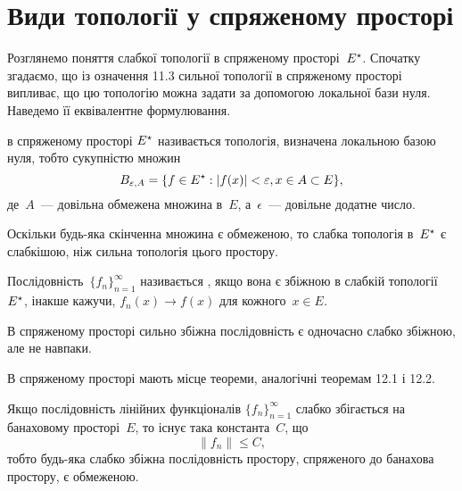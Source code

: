 \section{Види топології у спряженому просторі}

Розглянемо поняття слабкої топології в спряженому
просторі~$E^\star$. Спочатку згадаємо, що із \error означення 11.3 сильної
топології в спряженому просторі випливає, що цю топологію
можна задати за допомогою локальної бази нуля. Наведемо її
еквівалентне формулювання.

\begin{definition}
 в спряженому просторі
$E^\star$ називається топологія, визначена локальною базою нуля,
тобто сукупністю множин
\begin{equation*}
    B_{\varepsilon, A} = \{ f \in E^\star: |f(x)| < \varepsilon, x \in A \subset E\},
\end{equation*}
де~$A$~--- довільна обмежена множина в~$E$, а~$\epsilon$~--- довільне
додатне число.
\end{definition}

\begin{remark}
Оскільки будь-яка скінченна множина є
обмеженою, то слабка топологія в~$E^\star$ є слабкішою, ніж
сильна топологія цього простору.
\end{remark}

\begin{definition}
Послідовність~$\{f_n\}_{n = 1}^\infty$
називається ,
якщо вона є збіжною в слабкій топології~$E^\star$,
інакше кажучи, $f_n(x) \to f(x)$ для кожного~$x \in E$.
\end{definition}

\begin{remark}
В спряженому просторі сильно збіжна
послідовність є одночасно слабко збіжною, але не навпаки.
\end{remark}

В спряженому просторі мають місце теореми, аналогічні \error теоремам 12.1 і 12.2.

\begin{theorem}
Якщо послідовність лінійних функціоналів
$\{f_n\}_{n = 1}^\infty$
слабко збігається на банаховому просторі~$E$, то
існує така константа~$C$, що
\begin{equation*}
    \|f_n\| \le C,
\end{equation*}
тобто будь-яка слабко збіжна послідовність простору,
спряженого до банахова простору, є обмеженою.
\end{theorem}

